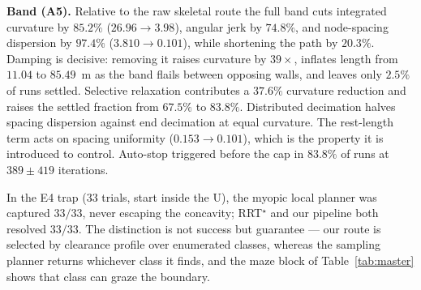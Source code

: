 \documentclass[conference]{IEEEtran}
\begin{document}
\textbf{Band (A5).} Relative to the raw skeletal route the full band cuts integrated curvature by $85.2\%$ ($26.96\rightarrow3.98$), angular jerk by $74.8\%$, and node-spacing dispersion by $97.4\%$ ($3.810\rightarrow0.101$), while shortening the path by $20.3\%$. Damping is decisive: removing it raises curvature by $39\times$, inflates length from $11.04$ to $85.49$~m as the band flails between opposing walls, and leaves only $2.5\%$ of runs settled. Selective relaxation contributes a $37.6\%$ curvature reduction and raises the settled fraction from $67.5\%$ to $83.8\%$. Distributed decimation halves spacing dispersion against end decimation at equal curvature. The rest-length term acts on spacing uniformity ($0.153\rightarrow0.101$), which is the property it is introduced to control. Auto-stop triggered before the cap in $83.8\%$ of runs at $389\pm419$ iterations.

In the E4 trap ($33$ trials, start inside the U), the myopic local planner was captured $33/33$, never escaping the concavity; RRT$^\star$ and our pipeline both resolved $33/33$. The distinction is not success but guarantee --- our route is selected by clearance profile over enumerated classes, whereas the sampling planner returns whichever class it finds, and the maze block of Table~\ref{tab:master} shows that class can graze the boundary.
\end{document}
